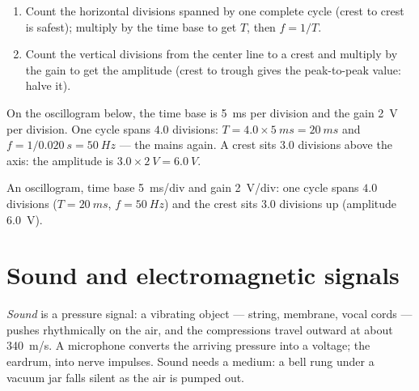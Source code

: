 \begin{method}\label{met:g10:signals-and-waves:oscillogram}
\begin{enumerate}
  \item Count the horizontal divisions spanned by one complete cycle
        (crest to crest is safest); multiply by the time base to get
        $T$, then $f = 1/T$.
  \item Count the vertical divisions from the center line to a crest and
        multiply by the gain to get the amplitude (crest to trough gives
        the peak-to-peak value: halve it).
\end{enumerate}
\end{method}

\begin{example}\label{ex:g10:signals-and-waves:reading}
On the oscillogram below, the time base is \qty{5}{ms} per division and
the gain \qty{2}{V} per division. One cycle spans $4.0$ divisions:
$T = 4.0 \times \qty{5}{ms} = \qty{20}{ms}$ and
$f = 1/\qty{0.020}{s} = \qty{50}{Hz}$ --- the mains again. A crest sits
$3.0$ divisions above the axis: the amplitude is
$3.0 \times \qty{2}{V} = \qty{6.0}{V}$.
\end{example}

\begin{omfigure}

{\small An oscillogram, time base \qty{5}{ms}/div and gain \qty{2}{V}/div:
one cycle spans $4.0$ divisions ($T = \qty{20}{ms}$, $f = \qty{50}{Hz}$)
and the crest sits $3.0$ divisions up (amplitude \qty{6.0}{V}).}
\end{omfigure}

\section{Sound and electromagnetic signals}

\begin{definition}[Sound]\label{def:g10:signals-and-waves:sound}
\emph{Sound} is a pressure signal: a vibrating object ---
string, membrane, vocal cords --- pushes rhythmically on the air, and
the compressions travel outward at about \qty{340}{m/s}. A microphone
converts the arriving pressure into a voltage; the eardrum, into nerve
impulses. Sound needs a medium: a bell rung under a vacuum jar falls
silent as the air is pumped out.
\end{definition}

